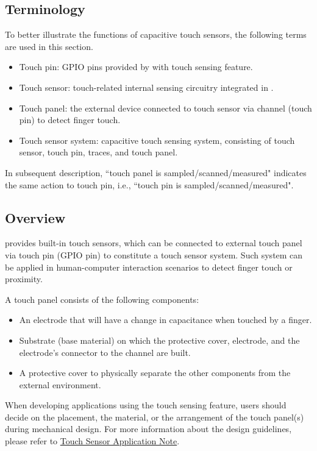 \documentclass[main\_\_EN.tex]{subfiles}
\begin{document}
\subsection{Terminology}
To better illustrate the functions of capacitive touch sensors, the following terms are used in this section.
\begin{itemize}
    \item Touch pin: GPIO pins provided by \chipname{} with touch sensing feature.
    \item Touch sensor: touch-related internal sensing circuitry integrated in \chipname{}.
    \item Touch panel: the external device connected to touch sensor via channel (touch pin) to detect finger touch.
    \item Touch sensor system: \chipname{} capacitive touch sensing system, consisting of touch sensor, touch pin, traces, and touch panel.
\end{itemize}
\begin{tiplisting}
   In subsequent description, ``touch panel is sampled/scanned/measured" indicates the same action to touch pin, i.e., ``touch pin is sampled/scanned/measured".
\end{tiplisting}
\subsection{Overview}

\chipname{} provides built-in touch sensors, which can be connected to external touch panel via touch pin (GPIO pin) to constitute a touch sensor system. Such system can be applied in human-computer interaction scenarios to detect finger touch or proximity.

A touch panel consists of the following components:

\begin{itemize}
\item An electrode that will have a change in capacitance when touched by a finger.
\item Substrate (base material) on which the protective cover, electrode, and the electrode's connector to the channel are built.
\item A protective cover to physically separate the other components from the external environment.
\end{itemize}
When developing applications using the touch sensing feature, users should decide on the placement, the material, or the arrangement of the touch panel(s) during mechanical design. For more information about the design guidelines, please refer to \href{https://github.com/espressif/esp-iot-solution/blob/release/v1.0/documents/touch_pad_solution/touch_sensor_design_en.md}{Touch Sensor Application Note}.
\end{document}
